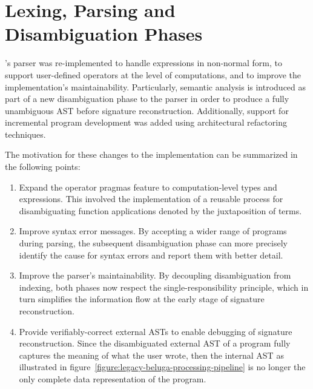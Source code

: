 


\section{\Beluga Lexing, Parsing and Disambiguation Phases}

\Beluga's parser was re-implemented to handle expressions in non-normal form, to support user-defined operators at the level of computations, and to improve the implementation's maintainability.
Particularly, semantic analysis is introduced as part of a new disambiguation phase to the parser in order to produce a fully unambiguous \ac{AST} before signature reconstruction.
Additionally, support for incremental program development was added using architectural refactoring techniques.

The motivation for these changes to the implementation can be summarized in the following points:
\begin{enumerate}
\item
Expand the operator pragmas feature to computation-level types and expressions.
This involved the implementation of a reusable process for disambiguating function applications denoted by the juxtaposition of terms.
\item
Improve syntax error messages.
By accepting a wider range of programs during parsing, the subsequent disambiguation phase can more precisely identify the cause for syntax errors and report them with better detail.
\item
Improve the parser's maintainability.
By decoupling disambiguation from indexing, both phases now respect the single-responsibility principle, which in turn simplifies the information flow at the early stage of signature reconstruction.
\item
Provide verifiably-correct external \acp{AST} to enable debugging of signature reconstruction.
Since the disambiguated external \ac{AST} of a program fully captures the meaning of what the user wrote, then the internal \ac{AST} as illustrated in figure~\ref{figure:legacy-beluga-processing-pipeline} is no longer the only complete data representation of the program.
\end{enumerate}

